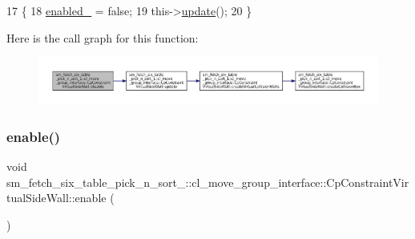 \begin{DoxyCode}
17         \{
18             \hyperlink{classsm__fetch__six__table__pick__n__sort__1_1_1cl__move__group__interface_1_1CpConstraintVirtualSideWall_a9018eb6e7d9b369e39ad70315192ab92}{enabled\_} = \textcolor{keyword}{false};
19             this->\hyperlink{classsm__fetch__six__table__pick__n__sort__1_1_1cl__move__group__interface_1_1CpConstraintVirtualSideWall_a7631ce0dba22a59484ad96eb0f5482d5}{update}();
20         \}
\end{DoxyCode}
Here is the call graph for this function\+:
\nopagebreak
\begin{figure}[H]
\begin{center}
\leavevmode
\includegraphics[width=350pt]{classsm__fetch__six__table__pick__n__sort__1_1_1cl__move__group__interface_1_1CpConstraintVirtualSideWall_a80e7bcc1442cdcf70193c5f8be21af02_cgraph}
\end{center}
\end{figure}
\mbox{\label{classsm__fetch__six__table__pick__n__sort__1_1_1cl__move__group__interface_1_1CpConstraintVirtualSideWall_acc0a42d9c29ee650e7d176011afce1df}} 
\subsubsection{\texorpdfstring{enable()}{enable()}}
{\footnotesize\ttfamily void sm\+\_\+fetch\+\_\+six\+\_\+table\+\_\+pick\+\_\+n\+\_\+sort\+\_\+::cl\+\_\+move\+\_\+group\+\_\+interface\+::\+Cp\+Constraint\+Virtual\+Side\+Wall\+::enable (\begin{DoxyParamCaption}{ }\end{DoxyParamCaption})}



